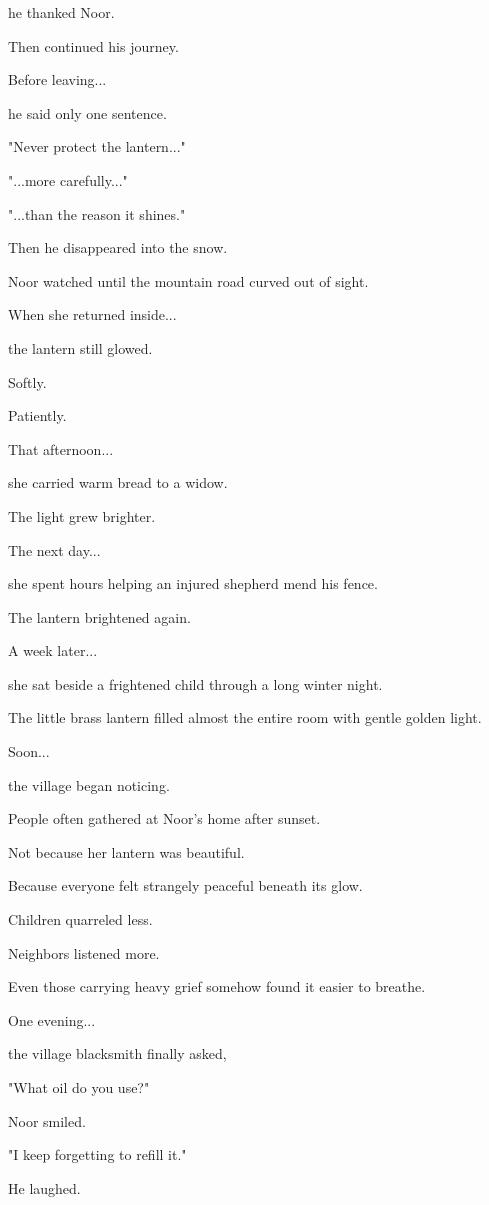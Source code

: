 \documentclass[12pt,openany]{book}
\begin{document}
he thanked Noor.

Then continued his journey.

Before leaving...

he said only one sentence.

"Never protect the lantern..."

"...more carefully..."

"...than the reason it shines."

Then he disappeared into the snow.

Noor watched until the mountain road curved out of sight.

When she returned inside...

the lantern still glowed.

Softly.

Patiently.

That afternoon...

she carried warm bread to a widow.

The light grew brighter.

The next day...

she spent hours helping an injured shepherd mend his fence.

The lantern brightened again.

A week later...

she sat beside a frightened child through a long winter night.

The little brass lantern filled almost the entire room with gentle golden light.

Soon...

the village began noticing.

People often gathered at Noor's home after sunset.

Not because her lantern was beautiful.

Because everyone felt strangely peaceful beneath its glow.

Children quarreled less.

Neighbors listened more.

Even those carrying heavy grief somehow found it easier to breathe.

One evening...

the village blacksmith finally asked,

"What oil do you use?"

Noor smiled.

"I keep forgetting to refill it."

He laughed.
\end{document}
